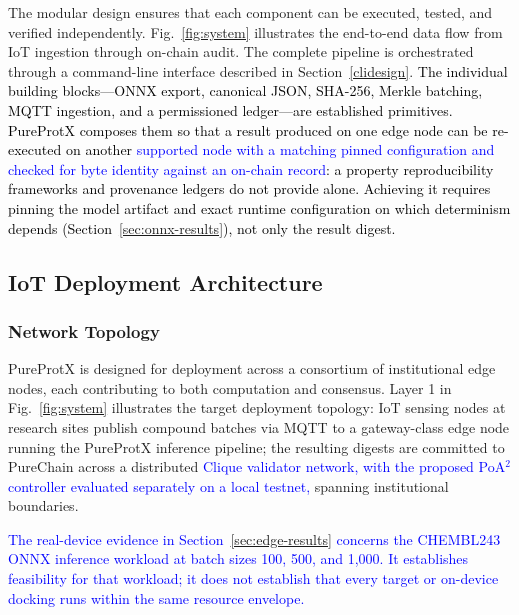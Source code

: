 \documentclass[conference]{IEEEtran}
\newcommand{\rev}[2]{\textcolor{blue}{#2}}
\begin{document}
The modular design ensures that each component can be executed,
tested, and verified independently.
Fig.~\ref{fig:system} illustrates the end-to-end data flow from
IoT ingestion through on-chain audit.
The complete pipeline is orchestrated through a command-line
interface described in Section~\ref{clidesign}.
\textcolor{black}{The individual building blocks---ONNX export,
canonical JSON, SHA-256, Merkle batching, MQTT ingestion,
and a permissioned ledger---are established primitives.
PureProtX composes them so that a result produced on one
edge node can be re-executed on another \rev{R1.1}{supported node with a matching pinned configuration and checked for byte identity against an on-chain record}: a property
reproducibility frameworks and provenance ledgers do not
provide alone. Achieving it requires pinning the model
artifact and exact runtime configuration on which
determinism depends (Section~\ref{sec:onnx-results}), not
only the result digest.}

\subsection{\textbf{IoT Deployment Architecture}}
\label{sec:iot-arch}

\subsubsection{Network Topology}

PureProtX is designed for deployment across a consortium of
institutional edge nodes, each contributing to both computation
and consensus. Layer 1 in
Fig.~\ref{fig:system} illustrates the target deployment topology:
IoT sensing nodes at research sites publish compound batches via
MQTT to a gateway-class edge node running the PureProtX inference
pipeline; the resulting digests are committed to PureChain across
a distributed \rev{R1.2, R1.3, R2.4}{Clique validator network, with the proposed PoA$^2$ controller evaluated separately on a local testnet,} spanning institutional
boundaries.

\rev{R1.1}{The real-device evidence in Section~\ref{sec:edge-results}
concerns the CHEMBL243 ONNX inference workload at batch sizes
100, 500, and 1,000. It establishes feasibility for that workload;
it does not establish that every target or on-device docking runs
within the same resource envelope.}
\end{document}
